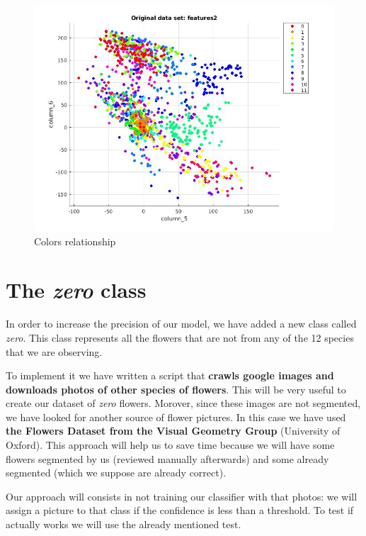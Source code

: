 \documentclass[11]{article}
\begin{document}
\begin{figure}[H]
    \centering
  \includegraphics[scale=0.22]{images/colors.jpg}
    \caption{Colors relationship}
\end{figure}

\section{The \textit{zero} class}

In order to increase the precision of our model, we have added a new class called \textit{zero}. This class represents all the flowers that are not from any of the 12 species that we are observing.
\medskip

To implement it we have written a script that \textbf{crawls google images and downloads photos of other species of flowers}. This will be very useful to create our dataset of \textit{zero} flowers. Morover, since these images are not segmented, we have looked for another source of flower pictures. In this case we have used \textbf{the Flowers Dataset from the Visual Geometry Group} (University of Oxford)\cite{Flower dataset}. This approach will help us to save time because we will have some flowers segmented by us (reviewed manually afterwards) and some already segmented (which we suppose are already correct).
\medskip

Our approach will consists in not training our classifier with that photos: we will assign a picture to that class if the confidence is less than a threshold. To test if actually works we will use the already mentioned test. 
\end{document}

